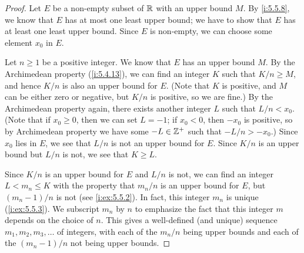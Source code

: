 \begin{proof}
  Let \(E\) be a non-empty subset of \(\mathbb{R}\) with an upper bound \(M\).
  By \cref{i:5.5.8}, we know that \(E\) has at most one least upper bound;
  we have to show that \(E\) has at least one least upper bound.
  Since \(E\) is non-empty, we can choose some element \(x_0\) in \(E\).

  Let \(n \geq 1\) be a positive integer.
  We know that \(E\) has an upper bound \(M\).
  By the Archimedean property (\cref{i:5.4.13}), we can find an integer \(K\) such that \(K / n \geq M\), and hence \(K / n\) is also an upper bound for \(E\).
  (Note that \(K\) is positive, and \(M\) can be either zero or negative, but \(K / n\) is positive, so we are fine.)
  By the Archimedean property again, there exists another integer \(L\) such that \(L / n < x_0\).
  (Note that if \(x_0 \geq 0\), then we can set \(L = -1\); if \(x_0 < 0\), then \(-x_0\) is positive, so by Archimedean property we have some \(-L \in \mathbb{Z}^+\) such that \(-L / n > -x_0\).)
  Since \(x_0\) lies in \(E\), we see that \(L / n\) is not an upper bound for \(E\).
  Since \(K / n\) is an upper bound but \(L / n\) is not, we see that \(K \geq L\).

  Since \(K / n\) is an upper bound for \(E\) and \(L / n\) is not, we can find an integer \(L < m_n \leq K\) with the property that \(m_n / n\) is an upper bound for \(E\), but \((m_n - 1) / n\) is not (see \cref{i:ex:5.5.2}).
  In fact, this integer \(m_n\) is unique (\cref{i:ex:5.5.3}).
  We subscript \(m_n\) by \(n\) to emphasize the fact that this integer \(m\) depends on the choice of \(n\).
  This gives a well-defined (and unique) sequence \(m_1, m_2, m_3, \dots\) of integers, with each of the \(m_n / n\) being upper bounds and each of the \((m_n - 1) / n\) not being upper bounds.


\end{proof}
